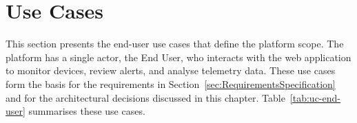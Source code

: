 
\section{Use Cases}
\label{sec:UseCases}

This section presents the end-user use cases that define the platform scope. The platform has a single actor, the End User, who interacts with the web application to monitor devices, review alerts, and analyse telemetry data. These use cases form the basis for the requirements in Section~\ref{sec:RequirementsSpecification} and for the architectural decisions discussed in this chapter. Table~\ref{tab:uc-end-user} summarises these use cases.

